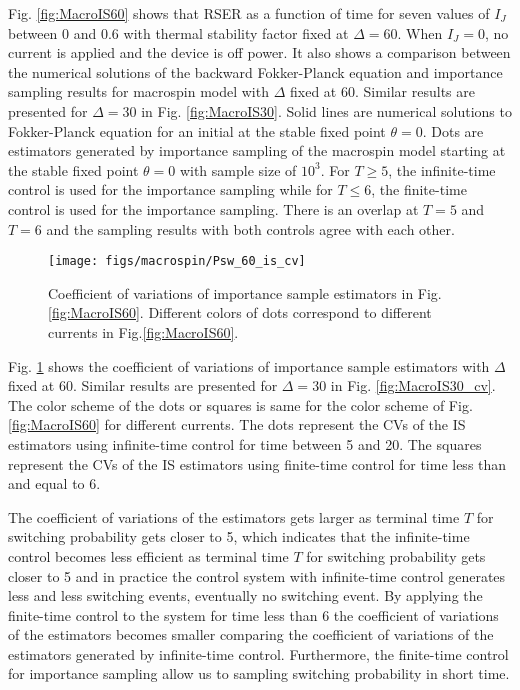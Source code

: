 \documentclass[journal,transmag]{IEEEtran}
\begin{document}
Fig. \ref{fig:MacroIS60} shows that RSER as a function of time for seven values of $I_J$ between $0$ and $ 0.6$ with thermal stability factor fixed at $\Delta = 60$. When $I_J = 0$, no current is applied and the device is off power. It also shows a comparison between the numerical solutions of the backward Fokker-Planck equation and importance sampling results for macrospin model with $\Delta$ fixed at $60$. Similar results are presented for $\Delta = 30$ in Fig. \ref{fig:MacroIS30}.  Solid lines are numerical solutions to Fokker-Planck equation for an initial at the stable fixed point $\theta = 0$. Dots are estimators generated by importance sampling of the macrospin model starting at the stable fixed point $\theta = 0$ with sample size of $10^3$. For $T \ge 5$, the infinite-time control is used for the importance sampling while for $T \le 6$, the finite-time control is used for the importance sampling. There is an overlap at $T = 5$ and $T = 6$ and the sampling results with both controls agree with each other.
\begin{figure}[h]
   \centering
         \texttt{[image: figs/macrospin/Psw\_60\_is\_cv]}
            \caption{Coefficient of variations of importance sample estimators in Fig.\ref{fig:MacroIS60}. Different colors of dots correspond to different currents in Fig.\ref{fig:MacroIS60}.}
   \label{fig:MacroIS60_cv}
\end{figure}

Fig. \ref{fig:MacroIS60_cv} shows the coefficient of variations of importance sample estimators with $\Delta$ fixed at 60.  Similar results are presented for $\Delta = 30$ in Fig. \ref{fig:MacroIS30_cv}. The color scheme of the dots or squares is same for the color scheme of  Fig. \ref{fig:MacroIS60} for different currents.  The dots represent  the CVs of the IS estimators using infinite-time control for time between 5 and 20.  The squares represent the CVs of the IS estimators using finite-time control for time less than and equal to 6.

The coefficient of variations of the estimators gets larger as terminal time $T$ for switching probability gets closer to 5, which indicates that the infinite-time control becomes less efficient as terminal time $T$ for switching probability gets closer to 5 and in practice the control system with infinite-time control generates less and less switching events, eventually no switching event. By applying the finite-time control to the system for time less than 6 the coefficient of variations of the estimators becomes smaller comparing the coefficient of variations of the estimators generated by infinite-time control. Furthermore, the finite-time control for importance sampling allow us to sampling switching probability in short time.
\end{document}
